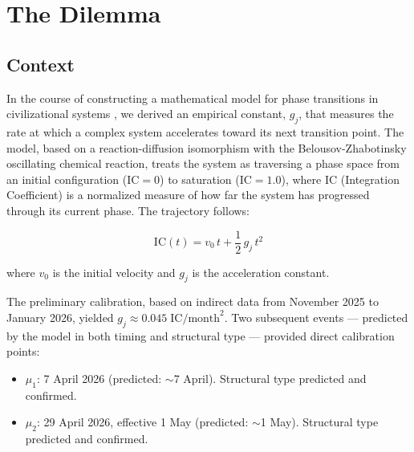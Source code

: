 \documentclass[12pt,a4paper]{article}
\newcommand{\gj}{g_j}
\begin{document}
\begin{abstract}
\vspace{0.5em}
\noindent\textbf{Keywords:} causal inversion, attractor dynamics, direction problem, teleological causation, pre-transition acceleration, complex systems, arrow of time, principle of least action

\vspace{0.5em}
\noindent\textbf{Status:} v1.1 --- notation aligned with the Ordinative Sciences Symbol Canon v1.2; under observation and continuous refinement.
\end{abstract}

\newpage
\tableofcontents
\newpage


\section{The Dilemma}

\subsection{Context}

In the course of constructing a mathematical model for phase transitions in civilizational systems \cite{ghioni2026collapse}, we derived an empirical constant, $\gj$, that measures the rate at which a complex system accelerates toward its next transition point. The model, based on a reaction-diffusion isomorphism with the Belousov-Zhabotinsky oscillating chemical reaction, treats the system as traversing a phase space from an initial configuration ($\mathrm{IC} = 0$) to saturation ($\mathrm{IC} = 1.0$), where IC (Integration Coefficient) is a normalized measure of how far the system has progressed through its current phase. The trajectory follows:

\begin{equation}\label{eq:trajectory}
\mathrm{IC}(t) = v_0\,t + \frac{1}{2}\,\gj\,t^2
\end{equation}

\noindent where $v_0$ is the initial velocity and $\gj$ is the acceleration constant.

The preliminary calibration, based on indirect data from November 2025 to January 2026, yielded $\gj \approx 0.045\;\mathrm{IC/month}^2$. Two subsequent events --- predicted by the model in both timing and structural type --- provided direct calibration points:

\begin{itemize}[leftmargin=2em]
    \item $\mu_1$: 7 April 2026 (predicted: $\sim$7 April). Structural type predicted and confirmed.
    \item $\mu_2$: 29 April 2026, effective 1 May (predicted: $\sim$1 May). Structural type predicted and confirmed.
\end{itemize}
\end{document}
